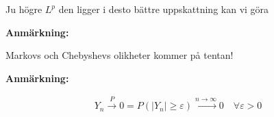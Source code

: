 \par\bigskip
\noindent Ju högre $L^p$ den ligger i desto bättre uppskattning kan vi göra
\par\bigskip
\noindent\textbf{Anmärkning:}\par
\noindent Markovs och Chebyshevs olikheter kommer på tentan!
\par\bigskip
\noindent\textbf{Anmärkning:}\par
\begin{equation*}
  \begin{gathered}
    Y_n\stackrel{P}{\rightarrow}0 = P(\left|Y_n\right|\geq\varepsilon)\stackrel{n\to\infty}{\rightarrow}0\quad\forall\varepsilon >0
  \end{gathered}
\end{equation*}
